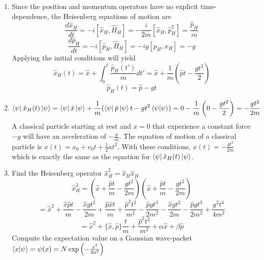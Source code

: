 \begin{sol}
\begin{enumerate}[label=\textbf{(\alph*)}]
\item
Since the position and momentum operators have no explicit time-dependence, the Heisenberg equations of motion are
\begin{equation}
	\frac{d\hat x_H}{dt}=-i[\hat x_H,\hat H_H]=-\frac{i}{2m}[\hat x_H,\hat p_H^2]=\frac{\hat p_H}{m}
\end{equation}
\begin{equation}
	\frac{d\hat p_H}{dt}=-i[\hat p_H,\hat H_H]=-ig[p_H, x_H]=-g
\end{equation}
Applying the initial conditions will yield
\begin{equation}
	\hat x_H(t)=\hat x+\int_0^t\frac{\hat p_H(t')}{m}dt'=\hat x+\frac{1}{m}\left(\hat pt-\frac{gt^2}{2}\right)
\end{equation}
\begin{equation}
	\hat p_H(t)=\hat p-gt
\end{equation} 
\item
\begin{equation}
	\bra\psi\hat x_H(t)\ket\psi=\bra\psi\hat x\ket\psi+\frac{1}{m}(\bra\psi\hat p\ket\psi t-gt^2\braket{\psi}{\psi})=0-\frac{1}{m}\left(0-\frac{gt^2}{2}\right)=-\frac{gt^2}{2m}
\end{equation}
A classical particle starting at rest and $x=0$ that experience a constant force $-g$ will have an acceleration of $-\frac{g}{m}$. The equation of motion of a classical particle is  $x(t)=x_0+v_0t+\frac{1}{2}at^2$. With these conditions, $x(t)=-\frac{gt^2}{2m}$ which is exactly the same as the equation for $\bra\psi\hat x_H(t)\ket\psi$.
\item
Find the Heisenberg operator $\hat x_H^2=\hat x_H\hat x_H$
\begin{equation}
	\hat x_H^2=\left(\hat x+\frac{\hat pt}{m}-\frac{gt^2}{2m}\right)\left(\hat x+\frac{\hat pt}{m}-\frac{gt^2}{2m}\right)
\end{equation} 
\begin{equation}
	=\hat x^2+\frac{\hat x\hat pt}{m}-\frac{\hat xgt^2}{2m}+\frac{\hat p\hat xt}{m}+\frac{\hat p^2t^2}{m^2}-\frac{\hat pgt^3}{2m^2}-\frac{\hat xgt^2}{2m}-\frac{\hat pgt^3}{2m^2}+\frac{g^2t^4}{4m^2}
\end{equation} 
\begin{equation}
	=\hat x^2+\{\hat x,\hat p\}\frac{t}{m}+\frac{\hat p^2t^2}{m^2}+\alpha\hat x+\beta\hat p
\end{equation}
Compute the expectation value on a Gaussian wave-packet $\braket{x}{\psi}=\psi(x)=N\exp\left(-\frac{x^2}{2a^2}\right)$ 

\end{enumerate}
\end{sol}

